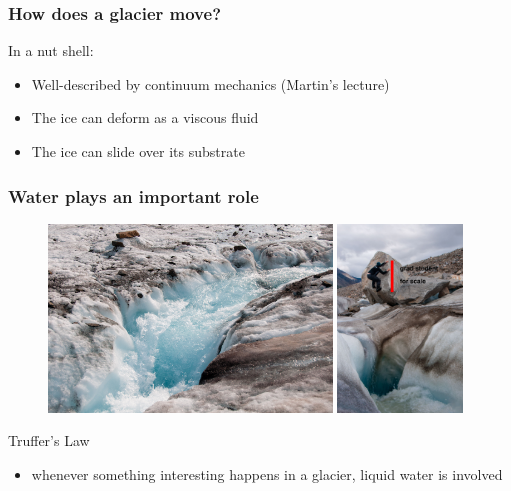 \documentclass[hide notes,intlimits,unknownkeysallowed]{beamer}
\begin{document}
\begin{frame}
  \frametitle{How does a glacier move?}
  \begin{block}{In a nut shell:}
    \begin{itemize}
    \item Well-described by continuum mechanics (Martin's lecture)
    \item The ice can deform as a viscous fluid
    \item The ice can slide over its substrate
    \end{itemize}
  \end{block}
\end{frame}

\begin{frame}
  \frametitle{Water plays an important role}
  \begin{figure}
    \includegraphics[height=5cm]{black-rapids-1} \vspace{0.25em}
    \includegraphics[height=5cm]{black-rapids-2}
  \end{figure}
  \begin{block}{Truffer's Law}
    \begin{itemize}
    \item whenever something interesting happens in a glacier, liquid water is involved
    \end{itemize}
  \end{block}
\end{frame}
\end{document}
